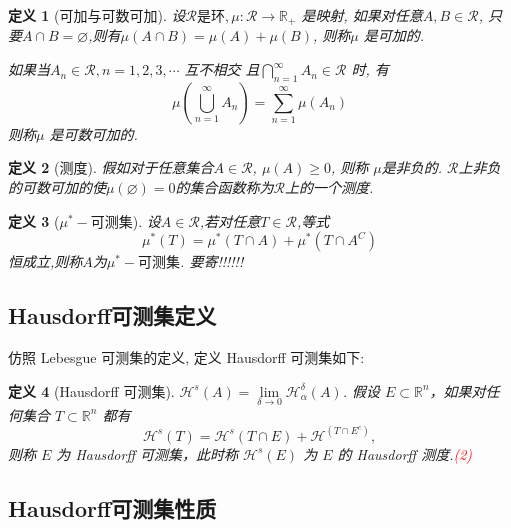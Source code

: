 \documentclass[hyperref,a4paper,UTF8]{ctexart}
\newtheorem{definition}{定义}[section]
\begin{document}
\begin{definition}[可加与可数可加]

  设$\mathscr{R} 是环,\mu : \mathscr{R} \rightarrow \mathbb{R}_+$ 是映射,
  如果对任意$A,B \in \mathscr{R}$,
  只要$A \cap B = \varnothing $,则有$\mu(A\cap B) = \mu(A) + \mu(B)$,
  则称$\mu$ 是可加的. 

  如果当$A_n \in \mathscr{R}, n = 1,2,3,\cdots$ 互不相交
  且$ \bigcap\limits_{n=1}^{\infty} A_n \in \mathscr{R}$ 时,
  有 
  \[
    \mu\left(\bigcup_{n=1}^{\infty} A_{n}\right) = \sum_{n=1}^{\infty} \mu\left(A_{n}\right)
  \]
  则称$\mu$ 是可数可加的.
\end{definition}

\begin{definition}[测度]

  假如对于任意集合$A \in \mathscr{R}$, $\mu(A) \geqslant 0$, 则称 $\mu $是非负的. 
  $\mathscr{R}$上非负的可数可加的使$\mu(\varnothing) = 0$的集合函数称为$\mathscr{R}$上的一个测度. 

\end{definition}

\begin{definition}[$\mu^*-\text{可测集}$]
  设$A\in\mathscr{R}$,若对任意$T \in \mathscr{R}$,等式
  \[
    \mu^*(T) = \mu^*(T \cap A) + \mu^*(T \cap A^C) 
  \]
  恒成立,则称$A$为$\mu^*-\text{可测集}$.
  要寄!!!!!!
\end{definition}

\subsection{Hausdorff可测集定义}

仿照 Lebesgue 可测集的定义, 定义 Hausdorff 可测集如下:

\begin{definition}[Hausdorff 可测集]
  $ \mathcal{H}^s(A) = \lim\limits_{\delta \to 0} \mathcal{H}_\alpha^\delta(A)$.
  假设 \( E \subset \mathbb{R}^n \)，如果对任何集合 \( T \subset \mathbb{R}^n \) 都有
  \[ 
    \mathcal{H}^s(T) = \mathcal{H}^s(T \cap E) + \mathcal{H}^(T \cap E^c), 
  \]
  则称 \( E \) 为 Hausdorff 可测集，此时称 \( \mathcal{H}^s(E) \) 为 \( E \) 的 Hausdorff 测度.\textrm{\textcolor{red}{(2)}}
\end{definition}

\subsection{Hausdorff可测集性质}
\end{document}
